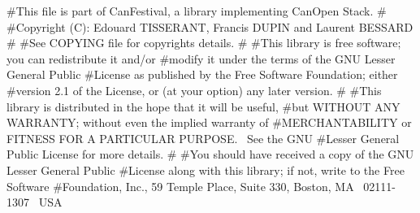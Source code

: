 \documentclass[12pt,twoside]{article}
\begin{document}
{\ttfamily
\#This file is part of CanFestival, a library implementing CanOpen
Stack. \newline
\# \newline
\#Copyright (C): Edouard TISSERANT, Francis DUPIN and Laurent BESSARD
\newline
\# \newline
\#See COPYING file for copyrights details. \newline
\# \newline
\#This library is free software; you can redistribute it and/or \newline
\#modify it under the terms of the GNU Lesser General Public \newline
\#License as published by the Free Software Foundation; either \newline
\#version 2.1 of the License, or (at your option) any later version.
\newline
\# \newline
\#This library is distributed in the hope that it will be useful,
\newline
\#but WITHOUT ANY WARRANTY; without even the implied warranty of
\newline
\#MERCHANTABILITY or FITNESS FOR A PARTICULAR PURPOSE. \ See the GNU
\newline
\#Lesser General Public License for more details. \newline
\# \newline
\#You should have received a copy of the GNU Lesser General Public
\newline
\#License along with this library; if not, write to the Free Software
\newline
\#Foundation, Inc., 59 Temple Place, Suite 330, Boston, MA
\ 02111{}-1307 \ USA }


\bigskip
\end{document}
